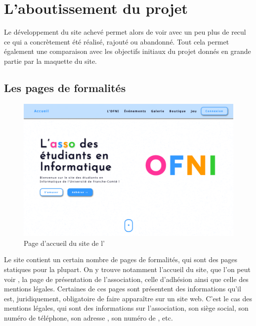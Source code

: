 \chapter{L'aboutissement du projet}
\label{chap:aboutissement}

Le développement du site achevé permet alors de voir avec un peu plus de recul ce qui a concrètement été réalisé, rajouté ou abandonné. Tout cela permet également une comparaison avec les objectifs initiaux du projet donnés en grande partie par la maquette du site.

\section{Les pages de formalités}
\label{sec:pages-formalites}

\begin{figure}[h]
    \centering
    \includegraphics[width=\textwidth]{assets/pictures/home-page.png}
    \caption{Page d'accueil du site de l'\ofni}
    \label{fig:home-page}
\end{figure}

Le site contient un certain nombre de pages de formalités, qui sont des pages statiques pour la plupart. On y trouve notamment l'accueil du site, que l'on peut voir , la page de présentation de l'association, celle d'adhésion ainsi que celle des mentions légales. Certaines de ces pages sont présentent des informations qu'il est, juridiquement, obligatoire de faire apparaître sur un site web. C'est le cas des mentions légales, qui sont des informations sur l'association, son siège social, son numéro de téléphone, son adresse , son numéro de , etc.

